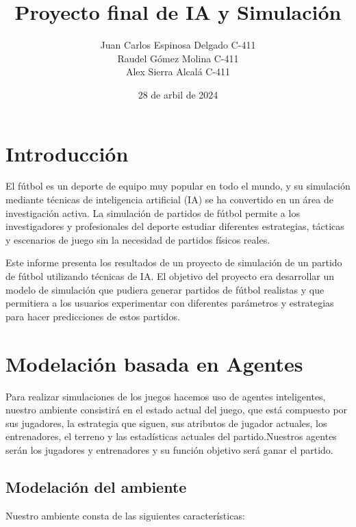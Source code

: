 \documentclass{article}
\title{Proyecto final de IA y Simulación}
\author{Juan Carlos Espinosa Delgado C-411 \\
        Raudel Gómez Molina C-411\\
        Alex Sierra Alcalá C-411
}
\date{28 de arbil de 2024}
\begin{document}
\maketitle
\newpage

\tableofcontents
\newpage

\section{Introducción}
El fútbol es un deporte de equipo muy popular en todo el mundo, y su simulación mediante técnicas de inteligencia
artificial (IA) se ha convertido en un área de investigación activa. La simulación de partidos de fútbol permite a
los investigadores y profesionales del deporte estudiar diferentes estrategias, tácticas y escenarios de juego sin la
necesidad de partidos físicos reales.

Este informe presenta los resultados de un proyecto de simulación de un partido de fútbol utilizando técnicas de IA. 
El objetivo del proyecto era desarrollar un modelo de simulación que pudiera generar partidos de fútbol realistas y 
que permitiera a los usuarios experimentar con diferentes parámetros y estrategias para hacer predicciones de estos 
partidos.
\newpage
\section{Modelación basada en Agentes}
Para realizar simulaciones de los juegos hacemos uso de agentes inteligentes, nuestro
ambiente consistirá en el estado actual del juego, que está compuesto por sus jugadores, la
estrategia que siguen, sus atributos de jugador actuales, los entrenadores, el terreno y las 
estadísticas actuales del partido.Nuestros agentes serán los jugadores y entrenadores y su función 
objetivo será ganar el partido.

\subsection{Modelación del ambiente}
Nuestro ambiente consta de las siguientes características:
\end{document}

